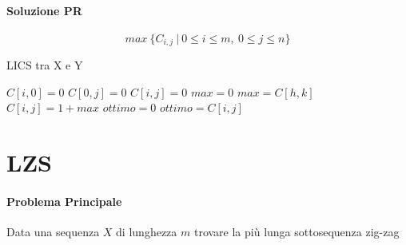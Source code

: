 \documentclass[12pt]{article}
\begin{document}
\paragraph{Soluzione PR}
$$max \ \{C_{i,j} \ | \ 0 \leq i \leq m, \ 0 \leq j \leq n\}$$
\newpage
\begin{algorithm}
    \caption{LICS tra X e Y}
    \begin{algorithmic}
        \STATE $C[i, 0]=0$
        \ENDFOR
        \STATE $C[0, j]=0$
        \ENDFOR
        \STATE $C[i,j]=0$
        \ENDIF
        \STATE $max=0$
        \STATE $max = C[h,k]$
        \ENDIF
        \ENDFOR
        \ENDFOR
        \STATE $C[i,j]=1+max$
        \ENDIF
        \ENDFOR
        \ENDFOR
        \STATE $ottimo=0$
        \STATE $ottimo = C[i,j]$
        \ENDIF
        \ENDFOR
        \ENDFOR
    \end{algorithmic}
\end{algorithm}
\newpage

\section{LZS}
\paragraph{Problema Principale}
Data una sequenza $X$ di lunghezza $m$ trovare la più lunga sottosequenza zig-zag
\end{document}
